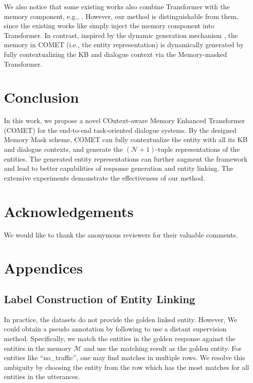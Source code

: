 \documentclass[11pt]{article}
\begin{document}
We also notice that some existing works also combine Transformer with the memory component, e.g., \cite{ma2021streaming}. 
However, our method is distinguishable from them, since the existing works like \cite{ma2021streaming} simply inject the memory component into Transformer.
In contrast, inspired by the dynamic generation mechanism \cite{GOU2020105912}, the memory in COMET (i.e., the entity representation) is dynamically generated by fully contextualizing the KB and dialogue context via the Memory-masked Transformer.


\section{Conclusion}
\label{sec:conclusion}

In this work, we propose a novel COntext-aware Memory Enhanced Transformer (COMET) for the end-to-end task-oriented dialogue systems. By the designed Memory Mask scheme, COMET can fully contextualize the entity with all its KB and dialogue contexts, and generate the $(\mathcal{N}+1)$-tuple representations of the entities. The generated entity representations can further augment the framework and lead to better capabilities of response generation and entity linking. The extensive experiments demonstrate the effectiveness of our method. 


\section*{Acknowledgements}
We would like to thank the anonymous reviewers for their valuable comments. 






\clearpage

\appendix

\section{Appendices}

\subsection{Label Construction of Entity Linking}
In practice, the datasets do not provide the golden linked entity. However, We could obtain a pseudo annotation by following \cite{qin-etal-2019-entity} to use a distant supervision method. Specifically, we match the entities in the golden response against the entities in the memory $\mathcal{M}$ and use the matching result as the golden entity. For entities like ``no\_traffic'', one may find matches in multiple rows. We resolve this ambiguity by choosing the entity from the row which has the most matches for all entities in the utterances.
\end{document}
